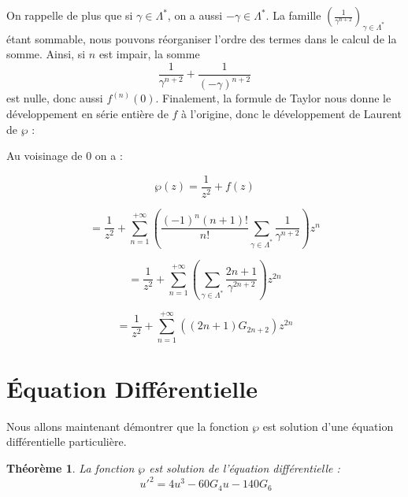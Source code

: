 \documentclass[12pt]{article}
\newtheorem{theorem}{Théorème}
\begin{document}
                On rappelle de plus que si \(\gamma \in \Lambda^*\), on a aussi \(-\gamma \in \Lambda^*\). La famille \(\left(\frac{1}{\gamma^{n+2}} \right)_{\gamma \in \Lambda^*}\) étant sommable, nous pouvons réorganiser l'ordre des termes dans le calcul de la somme. Ainsi, si \(n\) est impair, la somme
                \[
                \frac{1}{\gamma^{n+2}} + \frac{1}{(-\gamma)^{n+2}}
                \]
                est nulle, donc aussi \(f^{(n)}(0)\). Finalement, la formule de Taylor nous donne le développement en série entière de \(f\) à l'origine, donc le développement de Laurent de \(\wp\) :
                
                Au voisinage de 0 on a :
                
                \[
                \wp(z) = \frac{1}{z^2} + f(z)
                \]
                
                \[
                = \frac{1}{z^2} + \sum_{n=1}^{+\infty} \left( \frac{(-1)^n (n+1)!}{n!} \sum_{\gamma \in \Lambda^*} \frac{1}{\gamma^{n+2}} \right) z^n
                \]
                
                \[
                = \frac{1}{z^2} + \sum_{n=1}^{+\infty} \left( \sum_{\gamma \in \Lambda^*} \frac{2n+1}{\gamma^{2n+2}} \right) z^{2n}
                \]
                
                \[
                = \frac{1}{z^2} + \sum_{n=1}^{+\infty} \left( (2n+1) G_{2n+2} \right) z^{2n}
                \]
                
                \section*{Équation Différentielle}
                
                Nous allons maintenant démontrer que la fonction \(\wp\) est solution d'une équation différentielle particulière.
                
                \begin{theorem}
                La fonction \(\wp\) est solution de l'équation différentielle :
                \[
                \ u'^2 = 4u^3 - 60G_4 u - 140G_6
                \]
                \end{theorem}
                
\end{document}
